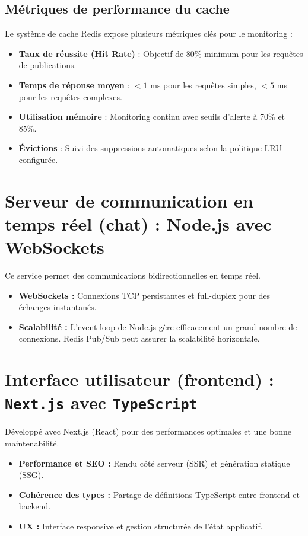 \documentclass[12pt]{rapportPfe}
\begin{document}
\subsection{Métriques de performance du cache}

Le système de cache Redis expose plusieurs métriques clés pour le monitoring :

\begin{itemize}
    \item \textbf{Taux de réussite (Hit Rate)} : Objectif de 80\% minimum pour les requêtes de publications.
    \item \textbf{Temps de réponse moyen} : $< 1$ ms pour les requêtes simples, $< 5$ ms pour les requêtes complexes.
    \item \textbf{Utilisation mémoire} : Monitoring continu avec seuils d'alerte à 70\% et 85\%.
    \item \textbf{Évictions} : Suivi des suppressions automatiques selon la politique LRU configurée.
\end{itemize}

\section{Serveur de communication en temps réel (chat) : Node.js avec WebSockets}

Ce service permet des communications bidirectionnelles en temps réel.

\begin{itemize}
    \item \textbf{WebSockets :} Connexions TCP persistantes et full-duplex pour des échanges instantanés.
    \item \textbf{Scalabilité :} L’event loop de Node.js gère efficacement un grand nombre de connexions. Redis Pub/Sub peut assurer la scalabilité horizontale.
\end{itemize}

\section{Interface utilisateur (frontend) : \texttt{Next.js} avec \texttt{TypeScript}}

Développé avec Next.js (React) pour des performances optimales et une bonne maintenabilité.

\begin{itemize}
    \item \textbf{Performance et SEO :} Rendu côté serveur (SSR) et génération statique (SSG).
    \item \textbf{Cohérence des types :} Partage de définitions TypeScript entre frontend et backend.
    \item \textbf{UX :} Interface responsive et gestion structurée de l’état applicatif.
\end{itemize}
\end{document}
